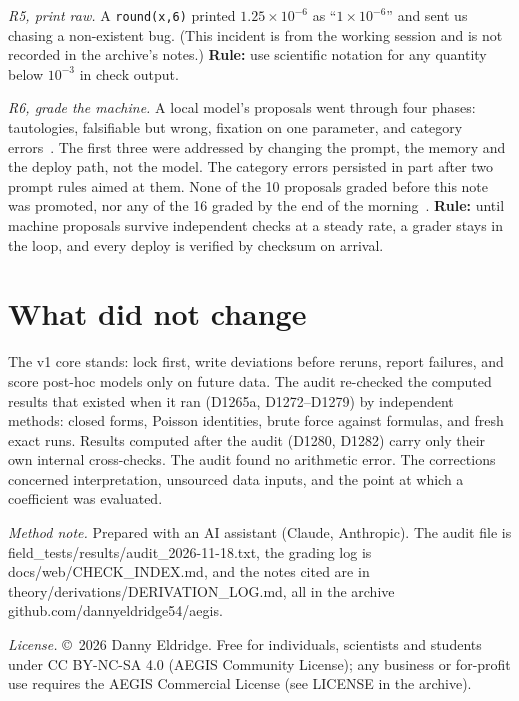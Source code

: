 \documentclass[aps,prd,twocolumn,superscriptaddress,nofootinbib,showkeys]{revtex4-2}
\begin{document}
\emph{R5, print raw.} A \texttt{round(x,6)} printed $1.25\times10^{-6}$ as ``$1\times10^{-6}$'' and sent us chasing a non-existent bug. (This incident is from the working session and is not recorded in the archive's notes.) \textbf{Rule:} use scientific notation for any quantity below $10^{-3}$ in check output.

\emph{R6, grade the machine.} A local model's proposals went through four phases: tautologies, falsifiable but wrong, fixation on one parameter, and category errors~\cite{CM}. The first three were addressed by changing the prompt, the memory and the deploy path, not the model. The category errors persisted in part after two prompt rules aimed at them. None of the 10 proposals graded before this note was promoted, nor any of the 16 graded by the end of the morning~\cite{CM}. \textbf{Rule:} until machine proposals survive independent checks at a steady rate, a grader stays in the loop, and every deploy is verified by checksum on arrival.

\section{What did not change}
The v1 core stands: lock first, write deviations before reruns, report failures, and score post-hoc models only on future data. The audit re-checked the computed results that existed when it ran (D1265a, D1272--D1279) by independent methods: closed forms, Poisson identities, brute force against formulas, and fresh exact runs. Results computed after the audit (D1280, D1282) carry only their own internal cross-checks. The audit found no arithmetic error. The corrections concerned interpretation, unsourced data inputs, and the point at which a coefficient was evaluated.

\emph{Method note.} Prepared with an AI assistant (Claude, Anthropic). The audit file is field\_tests/results/audit\_2026-11-18.txt, the grading log is docs/web/CHECK\_INDEX.md, and the notes cited are in theory/derivations/DERIVATION\_LOG.md, all in the archive github.com/dannyeldridge54/aegis.

\emph{License.} \copyright~2026 Danny Eldridge. Free for individuals, scientists and students under CC BY-NC-SA 4.0 (AEGIS Community License); any business or for-profit use requires the AEGIS Commercial License (see LICENSE in the archive).
\end{document}
